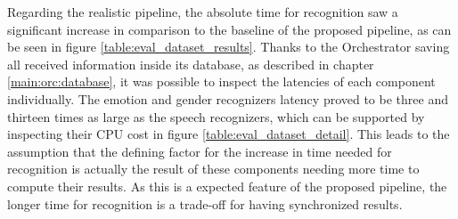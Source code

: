 { %
Regarding the realistic pipeline, the absolute time for recognition saw a significant increase in comparison to the baseline of the proposed pipeline, as can be seen in figure \ref{table:eval_dataset_results}.
Thanks to the Orchestrator saving all received information inside its database, as described in chapter \ref{main:orc:database}, it was possible to inspect the latencies of each component individually.
The emotion and gender recognizers latency proved to be three and thirteen times as large as the speech recognizers, which can be supported by inspecting their CPU cost in figure \ref{table:eval_dataset_detail}.
This leads to the assumption that the defining factor for the increase in time needed for recognition is actually the result of these components needing more time to compute their results.
As this is a expected feature of the proposed pipeline, the longer time for recognition is a trade-off for having synchronized results.
}

